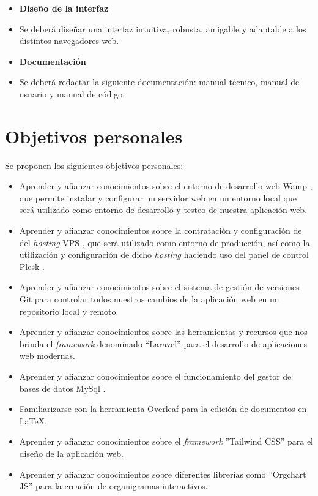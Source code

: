 \begin{itemize}
\begin{itemize}
        \end{itemize}
     
    \item \textbf{Diseño de la interfaz}
    \item[] Se deberá diseñar una interfaz intuitiva, robusta, amigable y adaptable a los distintos navegadores web.

    \item \textbf{Documentación}
    \item[] Se deberá redactar la siguiente documentación: manual técnico, manual de usuario y manual de código.
\end{itemize}

    
\section{Objetivos personales}

Se proponen los siguientes objetivos personales:
 \begin{itemize}
    \item Aprender y afianzar conocimientos sobre el entorno de desarrollo web Wamp \cite{wamp}, que permite instalar y configurar un servidor web en un entorno local que será utilizado como entorno de desarrollo y testeo de nuestra aplicación web.
    \item Aprender y afianzar conocimientos sobre la contratación y configuración de del \textit{hosting} VPS \cite{vps}, que será utilizado como entorno de producción, así como la utilización y configuración de dicho \textit{hosting} haciendo uso del panel de control Plesk \cite{plesk}.
    \item Aprender y afianzar conocimientos sobre el sistema de gestión de versiones Git \cite{git} para controlar todos nuestros cambios de la aplicación web en un repositorio local y remoto.
    \item Aprender y afianzar conocimientos sobre las herramientas y recursos que nos brinda el \textit{framework} denominado ``Laravel'' \cite{laravel} para el desarrollo de aplicaciones web modernas.
    \item  Aprender y afianzar conocimientos sobre el funcionamiento del gestor de bases de datos MySql \cite{mysql}.
    \item Familiarizarse con la herramienta Overleaf \cite{overleaf} para la edición de documentos en \LaTeX.   
     \item  Aprender y afianzar conocimientos sobre el \textit{framework} ''Tailwind CSS'' \cite{tailwind} para el diseño de la aplicación web.
     \item  Aprender y afianzar conocimientos sobre diferentes librerías como ''Orgchart JS'' \cite{orgchart} para la creación de organigramas interactivos.
 \end{itemize}
    
    
    